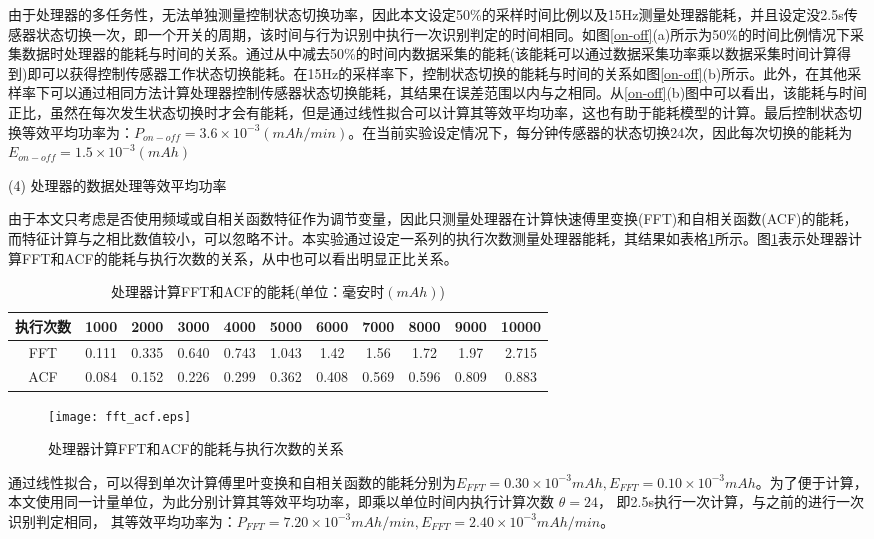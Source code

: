 \par 由于处理器的多任务性，无法单独测量控制状态切换功率，因此本文设定50\%的采样时间比例以及15Hz测量处理器能耗，并且设定没2.5s传感器状态切换一次，即一个开关的周期，该时间与行为识别中执行一次识别判定的时间相同。如图\ref{on-off}(a)所示为50\%的时间比例情况下采集数据时处理器的能耗与时间的关系。通过从中减去50\%的时间内数据采集的能耗(该能耗可以通过数据采集功率乘以数据采集时间计算得到)即可以获得控制传感器工作状态切换能耗。在15Hz的采样率下，控制状态切换的能耗与时间的关系如图\ref{on-off}(b)所示。此外，在其他采样率下可以通过相同方法计算处理器控制传感器状态切换能耗，其结果在误差范围以内与之相同。从\ref{on-off}(b)图中可以看出，该能耗与时间正比，虽然在每次发生状态切换时才会有能耗，但是通过线性拟合可以计算其等效平均功率，这也有助于能耗模型的计算。最后控制状态切换等效平均功率为：$P_{on-off} = 3.6 \times 10^{-3} (mAh/min)$。在当前实验设定情况下，每分钟传感器的状态切换24次，因此每次切换的能耗为$E_{on-off} = 1.5 \times 10^{-3}(mAh)$

	(4) 处理器的数据处理等效平均功率

\par 由于本文只考虑是否使用频域或自相关函数特征作为调节变量，因此只测量处理器在计算快速傅里变换(FFT)和自相关函数(ACF)的能耗，而特征计算与之相比数值较小，可以忽略不计。本实验通过设定一系列的执行次数测量处理器能耗，其结果如表格\ref{compute_energy}所示。图\ref{fft_acf}表示处理器计算FFT和ACF的能耗与执行次数的关系，从中也可以看出明显正比关系。

\begin{table}[htb]
    \centering
    \caption{处理器计算FFT和ACF的能耗(单位：毫安时$(mAh)$)}\label{compute_energy}
    \begin{tabular}{ccccccccccc}
    \toprule
    执行次数 & 1000 & 2000 & 3000 & 4000 & 5000 & 6000 & 7000 & 8000 & 9000 & 10000 \\
    \midrule
    FFT & 0.111 & 0.335 & 0.640 & 0.743 & 1.043 & 1.42 & 1.56 & 1.72 & 1.97 & 2.715 \\
    ACF & 0.084 & 0.152 & 0.226 & 0.299 & 0.362 & 0.408 & 0.569 & 0.596 & 0.809 & 0.883 \\
    \bottomrule
    \end{tabular}
 \end{table}

\begin{figure}[htb]
\centering
\texttt{[image: fft\_acf.eps]}
\caption{处理器计算FFT和ACF的能耗与执行次数的关系}\label{fft_acf}
\end{figure}

通过线性拟合，可以得到单次计算傅里叶变换和自相关函数的能耗分别为$E_{FFT} = 0.30 \times 10^{-3} mAh, E_{FFT} = 0.10 \times 10^{-3} mAh$。为了便于计算，本文使用同一计量单位，为此分别计算其等效平均功率，即乘以单位时间内执行计算次数 $\theta = 24$， 即2.5s执行一次计算，与之前的进行一次识别判定相同， 其等效平均功率为：$P_{FFT} = 7.20 \times 10^{-3} mAh/min, E_{FFT} = 2.40 \times 10^{-3} mAh/min$。

